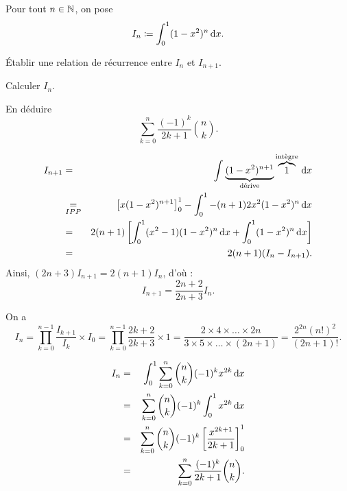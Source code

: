 \documentclass{magnolia}
\begin{document}
Pour tout $n\in\mathbb{N}$, on pose
\[I_n\coloneqq\int_{0}^{1} (1-x^2)^n\,\text{d}x.\]
\begin{questions}
\item Établir une relation de récurrence entre $I_{n}$ et $I_{n+1}$.
\item Calculer $I_{n}$.
\item En déduire \[\sum\limits_{k=0}^{n} \frac{(-1)^k}{2k+1}\binom{n}{k}.\]
\end{questions}

\begin{sol}
\begin{questions}
\item 
\begin{eqnarray*}
I_{n+1}&=&\int_{}^{} \underbrace{(1-x^2)^{n+1}}_{\text{d\'erive}} \overbrace{1}^{\text{int\`egre}}\,\text{d}x\\
&\underset{IPP}{=}&\left[x(1-x^2)^{n+1}\right]_0^1-\int_{0}^{1} -(n+1)2x^2(1-x^2)^n\,\text{d}x\\
&=&2(n+1)\left[\int_{0}^{1} (x^2-1)(1-x^2)^n\,\text{d}x+\int_{0}^{1} (1-x^2)^n\,\text{d}x\right]\\
&=&2(n+1)(I_n-I_{n+1}) .
\end{eqnarray*}
Ainsi, $(2n+3)I_{n+1}=2(n+1)I_n$, d'où :
$$\boxed{I_{n+1}=\frac{2n+2}{2n+3}I_n.}$$
\item On a $$\displaystyle I_n=\prod_{k=0}^{n-1}\frac{I_{k+1}}{I_k}\times I_0=\prod_{k=0}^{n-1}\frac{2k+2}{2k+3}\times 1=\frac{2\times 4\times \ldots \times 2n }{3\times 5\times \ldots \times (2n+1)}=\frac{2^{2n}(n!)^2}{(2n+1)!}.$$
\item 
\begin{eqnarray*}
I_{n}&=&\int_{0}^{1} \sum_{k=0}^n\binom{n}{k}(-1)^kx^{2k}\,\text{d}x\\
&=&\sum_{k=0}^n\binom{n}{k}(-1)^k\int_{0}^{1} x^{2k}\,\text{d}x\\
&=&\sum_{k=0}^n\binom{n}{k}(-1)^k\left[\frac{x^{2k+1}}{2k+1}\right]_0^1\\
&=&\sum_{k=0}^{n} \frac{(-1)^k}{2k+1}\binom{n}{k} .
\end{eqnarray*}
\end{questions}
\end{sol}



\end{document}
